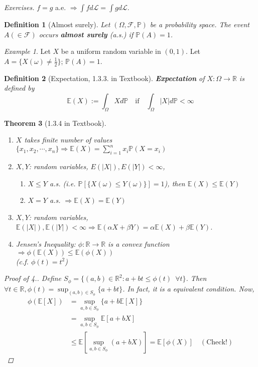 \documentclass[12pt]{report}
\renewcommand{\1}{\mathbb{1}}
\theoremstyle{break}
\newtheorem{thm}{Theorem}[section] %
\theoremstyle{newdef}
\newtheorem{defn}[thm]{Definition} %
\theoremstyle{remark}
\newtheorem*{exmp}{Example} %
\begin{document}
\textit{Exercises.} $f = g$ a.e. $\Rightarrow \int fd\mathcal{L} = \int g d\mathcal{L}$.

\begin{defn}[Almost surely]
Let $(\Omega, \mathcal{F}, \mathbb{P})$ be a probability space.
The event $A (\in \mathcal{F})$ occurs \textbf{almost surely} (a.s.) if $\mathbb{P}(A) = 1$.
\end{defn}

\begin{exmp}
Let $X$ be a uniform random variable in $(0,1)$.
Let $A = \{ X(\omega) \neq \frac{1}{2}\}$; $\mathbb{P}(A) = 1$.
\end{exmp}



\begin{defn}[Expectation, 1.3.3. in Textbook]
\textbf{Expectation} of $X : \Omega \rightarrow \mathbb{R}$ is defined by
$$\mathbb{E}(X) := \int_\Omega X d\mathbb{P} \quad \text{if} \quad \int_{\Omega}|X|d\mathbb{P} < \infty$$ 
\end{defn}

\begin{thm}[1.3.4 in Textbook]
\leavevmode
\vspace{-6mm}
\begin{enumerate}
\item $X$ takes finite number of values $\{x_1,x_2, \cdots, x_n\} \Rightarrow \mathbb{E}(X) = \sum_{i=1}^n x_i\mathbb{P}(X = x_i)$
\item $X, Y$: random variables, $E(|X|), E(|Y|) < \infty$,
\begin{enumerate}[label = (\roman*)]
\item $X \leq Y$ a.s. (i.e. $\mathbb{P}[\{X(\omega) \leq Y(\omega)\}]=1$), then $\mathbb{E}(X) \leq \mathbb{E}(Y)$
\item $X = Y$ a.s. $\Rightarrow \mathbb{E}(X) = \mathbb{E}(Y)$
\end{enumerate}
\item $X, Y$: random variables, $\mathbb{E}(|X|), \mathbb{E}(|Y|) < \infty \Rightarrow \mathbb{E}(\alpha X + \beta Y) = \alpha \mathbb{E}(X) + \beta \mathbb{E}(Y)$.
\item Jensen's Inequality: $\phi : \mathbb{R} \rightarrow \mathbb{R}$ is a convex function $\Rightarrow \phi(\mathbb{E}(X)) \leq \mathbb{E}(\phi(X))$\\
(c.f. $\phi(t) = t^2$)
\end{enumerate}

\begin{proof}[Proof of 4.]
Define $S_\phi = \{(a,b) \in \mathbb{R}^2 : a + bt \leq \phi(t) \enspace \forall t\}$.
Then $\forall t \in \mathbb{R}, \phi(t) = \sup_{(a,b) \in S_\phi} \{a+bt\}$.
In fact, it is a equivalent condition. Now,
$$
\begin{aligned}
\phi(\mathbb{E}[X]) &= \sup_{a,b\in S_\phi} \{a + b\mathbb{E}[X]\}\\
&= \sup_{a,b \in S_\phi} \mathbb{E}[a+bX]\\
&\leq \mathbb{E}[\sup_{a,b\in S_\phi}(a+bX)] = \mathbb{E}[\phi(X)] \quad (\text{Check!})
\end{aligned}
$$
\end{proof}
\end{thm}
\end{document}
